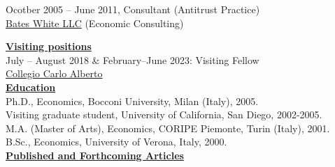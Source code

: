 \documentclass[12pt]{article}
\begin{document}
Ocotber 2005 -- June 2011, Consultant (Antitrust Practice)\\
\hspace*{10mm} \underline{Bates White LLC} (Economic Consulting)

\underline{\textbf{Visiting positions}}\\

July -- August 2018 \& February--June 2023: Visiting Fellow\\ 
\hspace*{10mm} \underline{Collegio Carlo Alberto}\\

\underline{\textbf{Education}}\\
Ph.D., Economics, Bocconi University, Milan (Italy), 2005.\\
Visiting graduate student, University of California, San Diego, 2002-2005. \\
M.A. (Master of Arts), Economics, CORIPE Piemonte, Turin (Italy), 2001. \\
B.Sc., Economics, University of Verona, Italy, 2000.\\
\newpage
\underline{\textbf{Published and Forthcoming Articles}}
\end{document}

